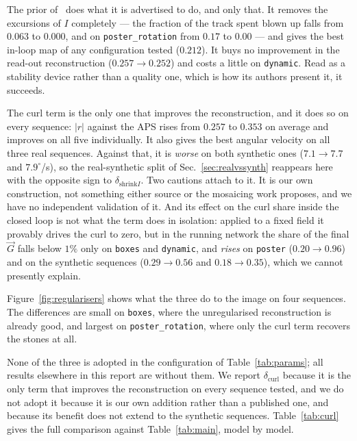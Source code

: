 \documentclass[journal]{IEEEtran}
\newcommand{\Imap}{I}
\newcommand{\Gmap}{\vec{G}}
\begin{document}
The prior of~\cite{guo2024emba} does what it is advertised to do, and only
that. It removes the excursions of $\Imap$ completely --- the fraction of the
track spent blown up falls from $0.063$ to $0.000$, and on
\texttt{poster\_rotation} from $0.17$ to $0.00$ --- and gives the best in-loop
map of any configuration tested ($0.212$). It buys no improvement in the
read-out reconstruction ($0.257 \rightarrow 0.252$) and costs a little on
\texttt{dynamic}. Read as a
stability device rather than a quality one, which is how its authors present
it, it succeeds.

The curl term is the only one that improves the reconstruction, and it does so
on every sequence: $|r|$ against the APS rises from $0.257$ to
$0.353$ on average and improves on all five individually. It also gives the
best angular velocity on all three real sequences. Against that, it is
\emph{worse} on both synthetic ones ($7.1 \rightarrow 7.7$ and
$7.9^\circ$/s), so the
real-synthetic split of Sec.~\ref{sec:realvssynth} reappears here with the
opposite sign to $\delta_{\text{shrink}I}$. Two cautions attach to it. It is
our own construction, not something either source or the mosaicing work
proposes, and we have no independent validation of it. And its effect on the
curl share inside the closed loop is not what the term does in isolation:
applied to a fixed field it provably drives the curl to zero, but in the
running network the share of the final $\Gmap$ falls below $1\%$ only on
\texttt{boxes} and \texttt{dynamic}, and \emph{rises} on \texttt{poster}
($0.20 \rightarrow 0.96$) and on the synthetic sequences
($0.29 \rightarrow 0.56$ and $0.18 \rightarrow 0.35$), which we cannot
presently explain.

Figure~\ref{fig:regularisers} shows what the three do to the image on four
sequences. The differences are small on \texttt{boxes}, where the
unregularised reconstruction is already good, and largest on
\texttt{poster\_rotation}, where only the curl term recovers the stones at all.

None of the three is adopted in the configuration of Table~\ref{tab:params};
all results elsewhere in this report are without them. We report
$\delta_{\text{curl}}$ because it is the only term that improves the
reconstruction on every sequence tested, and we do not adopt it because it is
our own addition rather than a published one, and because its benefit does not
extend to the synthetic sequences. Table~\ref{tab:curl} gives the full
comparison against Table~\ref{tab:main}, model by model.
\end{document}
